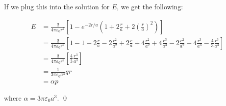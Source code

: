\documentclass{homework}
\newcommand\ve{\varepsilon}
\newcommand{\pfrac}[2]{
    \ensuremath{ \left( \frac{#1}{#2} \right)}
  }
\begin{document}
\begin{homeworkProblem}[Problem 4.2]
{  If we plug this into the solution for $E$, we get the following:

  \begin{align*}
    E &= \frac{q}{4 \pi \ve_0 r^2} \left[ 1 - e^{-2 r / a} \left(1 + 2 \frac{r}{a} + 2 \pfrac{r}{a}^2  \right) \right] \\
      &= \frac{q}{4 \pi \ve_0 r^2} \left[1 - 1 -2\frac{r}{a} - 2\frac{r^2}{a^2} + 2\frac{r}{a} + 4\frac{r^2}{a^2} + 4\frac{r^3}{a^3} - 2\frac{r^2}{a^2} - 4\frac{r^3}{a^3} - \frac{4}{3}\frac{r^3}{a^3}  \right] \\
      &= \frac{q}{4 \pi \ve_0 r^2} \left[ \frac{4}{3} \frac{r^3}{a^3} \right] \\
      &= \frac{1}{3 \pi \ve_0 a^3} qr \\
      &= \alpha p
  \end{align*}

  where $\alpha =3 \pi \ve_0 a^3$.
  \qed

  }
\end{homeworkProblem}
\end{document}
